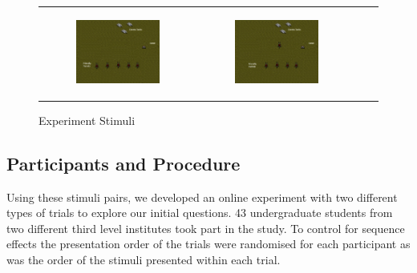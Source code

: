 \documentclass[11pt,letterpaper]{article}
\begin{document}
\begin{figure}
{\begin{tabular}{cccc}
\begin{subfigure}[b]{0.18\textwidth}\includegraphics[width=\textwidth]{figures/turrets.jpeg}\caption{}\label{fig:turrets-a}\end{subfigure}&
\begin{subfigure}[b]{0.18\textwidth}\includegraphics[width=\textwidth]{figures/turrets-plus-one.jpeg}\caption{}\label{fig:turrets-b}\end{subfigure}
\end{tabular}
}
\caption{Experiment Stimuli}
\label{fig:exp_stimuli}
\end{figure}

\subsection{Participants and Procedure}
Using these stimuli pairs, we developed an online experiment with two different types of trials to explore our initial questions. 43 undergraduate students from two different third level institutes took part in the study. To control for sequence effects the presentation order of the trials were randomised for each participant as was the order of the stimuli presented within each trial.   
\end{document}
